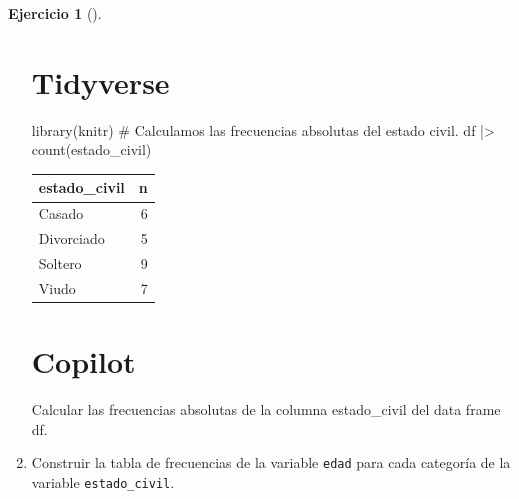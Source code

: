 \documentclass[
  a4paper,
]{scrreport}
\newenvironment{Shaded}{\begin{snugshade}}{\end{snugshade}}
\newcommand{\CommentTok}[1]{\textcolor[rgb]{0.37,0.37,0.37}{#1}}
\newcommand{\ExtensionTok}[1]{\textcolor[rgb]{0.00,0.23,0.31}{#1}}
\newcommand{\FunctionTok}[1]{\textcolor[rgb]{0.28,0.35,0.67}{#1}}
\newcommand{\NormalTok}[1]{\textcolor[rgb]{0.00,0.23,0.31}{#1}}
\newcommand{\SpecialCharTok}[1]{\textcolor[rgb]{0.37,0.37,0.37}{#1}}
\theoremstyle{definition}
\newtheorem{exercise}{Ejercicio}[chapter]
\theoremstyle{remark}
\begin{document}
\begin{exercise}[]
\begin{enumerate}
\begin{tcolorbox}
  \section{Tidyverse}

\begin{Shaded}
\begin{Highlighting}[]
\FunctionTok{library}\NormalTok{(knitr)}
\CommentTok{\# Calculamos las frecuencias absolutas del estado civil.}
\NormalTok{df }\SpecialCharTok{|\textgreater{}} \FunctionTok{count}\NormalTok{(estado\_civil)}
\end{Highlighting}
\end{Shaded}

  \begin{longtable}[]{@{}lr@{}}
  \toprule\noalign{}
  estado\_civil & n \\
  \midrule\noalign{}
  \endhead
  \bottomrule\noalign{}
  \endlastfoot
  Casado & 6 \\
  Divorciado & 5 \\
  Soltero & 9 \\
  Viudo & 7 \\
  \end{longtable}

  \section{Copilot}

\begin{Shaded}
\begin{Highlighting}[]
\ExtensionTok{Calcular}\NormalTok{ las frecuencias absolutas de la columna estado\_civil del data frame df.}
\end{Highlighting}
\end{Shaded}

  \end{tcolorbox}
\item
  Construir la tabla de frecuencias de la variable \texttt{edad} para
  cada categoría de la variable \texttt{estado\_civil}.

  \begin{tcolorbox}[enhanced jigsaw, colframe=quarto-callout-tip-color-frame, toprule=.15mm, bottomtitle=1mm, breakable, opacitybacktitle=0.6, toptitle=1mm, colback=white, bottomrule=.15mm, title=\textcolor{quarto-callout-tip-color}{\faLightbulb}\hspace{0.5em}{Solución}, arc=.35mm, left=2mm, titlerule=0mm, rightrule=.15mm, coltitle=black, leftrule=.75mm, opacityback=0, colbacktitle=quarto-callout-tip-color!10!white]


\end{tcolorbox}
\end{enumerate}
\end{exercise}
\end{document}
